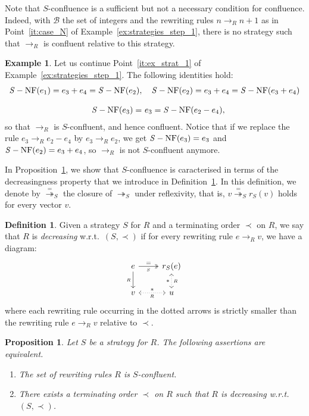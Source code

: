 \documentclass[11pt]{article}
\newtheorem{proposition}[theorem]{Proposition}
\theoremstyle{definition}
\newtheorem{definition}[theorem]{Definition}
\newtheorem{example}[theorem]{Example}
\newcommand\basis{\mathscr{B}}
\newcommand\rewR{\to_R}
\newcommand\parS{\twoheadrightarrow_S}
\DeclareMathOperator{\SNF}{{\it S}-NF}
\begin{document}
Note that $S$-confluence is a sufficient but not a necessary condition for
confluence. Indeed, with $\basis$ the set of integers and the rewriting rules
$n\rewR n+1$ as in Point~\ref{it:case_N} of
Example~\ref{ex:strategies_step_1}, there is no strategy such that
$\rewR$ is confluent relative to this strategy. 
\smallskip

\begin{example}\label{ex:S-conf}
  Let us continue Point~\ref{it:ex_strat_1} of
  Example~\ref{ex:strategies_step_1}. The following identities hold:
  \[\begin{split}
  \SNF(e_1)=e_3+e_4=\SNF(e_2),&\quad\SNF(e_2)=e_3+e_4=\SNF(e_3+e_4)
  \\[0.3cm]
  \SNF(e_3)=& \ e_3=\SNF(e_2-e_4),
  \end{split}
  \smallskip\]
  so that $\rewR$ is $S$-confluent, and hence confluent. Notice that if
  we replace the rule $e_3\rewR e_2-e_4$ by $e_3\rewR e_2$, we get
  $\SNF(e_3)=e_3$ and $\SNF(e_2)=e_3+e_4$, so $\rewR$ is not
  $S$-confluent anymore. 
\end{example}
\smallskip

In Proposition~\ref{prop:S-conf_decreasing}, we show that $S$-confluence
is caracterised in terms of the decreasingness property that we introduce
in Definition~\ref{def:decreasing}. In this definition, we denote by
$\overset{=}{\twoheadrightarrow}_S$ the closure of $\parS$ under
reflexivity, that is, $v\overset{=}{\twoheadrightarrow}_Sr_S(v)$ holds 
for every vector $v$.
\smallskip

\begin{definition}\label{def:decreasing}
  Given a strategy $S$ for $R$ and a terminating order $\prec$ on $R$, we
  say that $R$ is {\em decreasing} w.r.t.\ $(S,\prec)$ if for every
  rewriting rule $e\rewR v$, we have a diagram:
  \[\begin{tikzcd}
      e\ar[d, "_R"']\ar[r, twoheadrightarrow, "=", "_S"'] &
      r_S(e)\ar[d, leftrightarrow, dotted, "*"', "_R"]\\
      v\ar[r, leftrightarrow, dotted, "*", "_R"'] & u
    \end{tikzcd}\]
  where each rewriting rule occurring in the dotted arrows is strictly
  smaller than the rewriting rule $e\rewR v$ relative to $\prec$.
\end{definition}
\smallskip

\begin{proposition}\label{prop:S-conf_decreasing}
  Let $S$ be a strategy for $R$. The following assertions are equivalent.
  \begin{enumerate}
  \item The set of rewriting rules $R$ is $S$-confluent.
  \item There exists a terminating order $\prec$ on $R$ such that $R$ is
    decreasing w.r.t.\ $(S,\prec)$.
  \end{enumerate}
\end{proposition}
\end{document}
